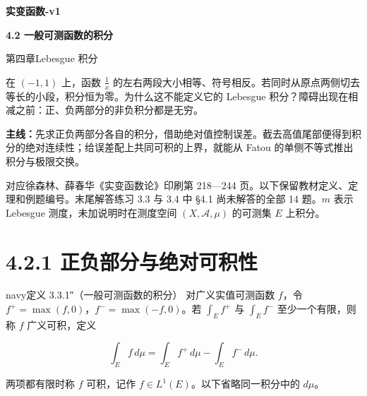 \documentclass[11pt,a4paper]{article}
\begin{document}
\begin{center}{\LARGE\bfseries 实变函数-v1\par}\vspace{7pt}
{\Large\bfseries 4.2 一般可测函数的积分\par}\vspace{6pt}
{第四章\quad Lebesgue 积分\par}\end{center}
在 \((-1,1)\) 上，函数 \(\frac{1}{x}\)
的左右两段大小相等、符号相反。若同时从原点两侧切去等长的小段，积分恒为零。为什么这不能定义它的
Lebesgue 积分？障碍出现在相减之前：正、负两部分的非负积分都是无穷。
\par\textbf{主线：}先求正负两部分各自的积分，借助绝对值控制误差。截去高值尾部便得到积分的绝对连续性；给误差配上共同可积的上界，就能从
Fatou 的单侧不等式推出积分与极限交换。
\begin{center}
\end{center}
对应徐森林、薛春华《实变函数论》印刷第 218---244
页。以下保留教材定义、定理和例题编号。末尾解答练习 3.3 与 3.4 中 §4.1
尚未解答的全部 14 题。\(m\) 表示 Lebesgue 测度，未加说明时在测度空间
\((X,\mathcal A,\mu)\) 的可测集 \(E\) 上积分。
\begingroup\small\setlength{\parskip}{0pt}\tableofcontents\endgroup
\newpage
\clearpage\section[\S{}4.2.1
正负部分与绝对可积性]{4.2.1
正负部分与绝对可积性}\label{ux6b63ux8d1fux90e8ux5206ux4e0eux7eddux5bf9ux53efux79efux6027}

\begin{sboxenv}{navy}{定义 3.3.1″（一般可测函数的积分）}
对广义实值可测函数 \(f\)，令 \(f^+=\max(f,0)\)，\(f^-=\max(-f,0)\)。若
\(\int_E f^+\) 与 \(\int_E f^-\) 至少一个有限，则称 \(f\) 广义可积，定义

\begin{equation*}
\int_E f\,d\mu=\int_E f^+\,d\mu-\int_E f^-\,d\mu .\tag{4.2.1}
\end{equation*}

两项都有限时称 \(f\) 可积，记作 \(f\in L^1(E)\)。以下省略同一积分中的
\(d\mu\)。

\end{sboxenv}
\end{document}

